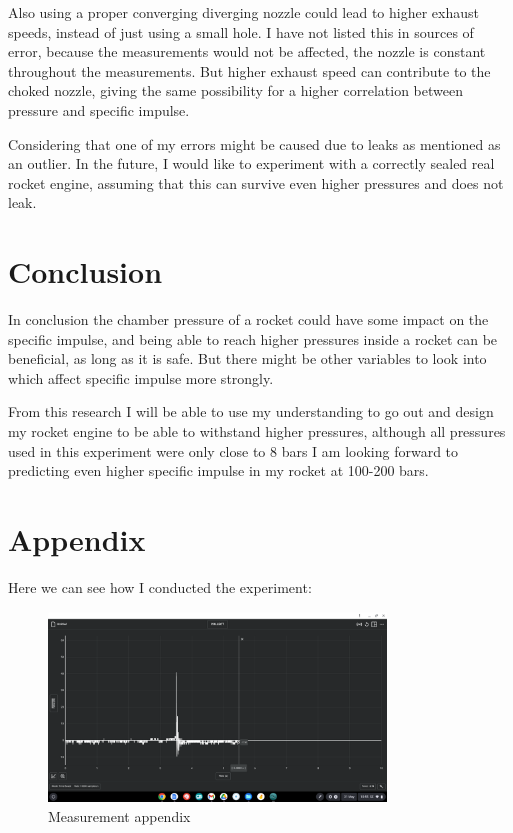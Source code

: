 \documentclass[12pt,a4paper]{article}
\begin{document}
Also using a proper converging diverging nozzle could lead to higher exhaust speeds, instead of just using a small hole. I have not listed this in sources of error, because the measurements would not be affected, the nozzle is constant throughout the measurements. But higher exhaust speed can contribute to the choked nozzle, giving the same possibility for a higher correlation between pressure and specific impulse.

Considering that one of my errors might be caused due to leaks as mentioned as an outlier. In the future, I would like to experiment with a correctly sealed real rocket engine, assuming that this can survive even higher pressures and does not leak.

\section{Conclusion}

In conclusion the chamber pressure of a rocket could have some impact on the specific impulse, and being able to reach higher pressures inside a rocket can be beneficial, as long as it is safe. But there might be other variables to look into which affect specific impulse more strongly.

From this research I will be able to use my understanding to go out and design my rocket engine to be able to withstand higher pressures, although all pressures used in this experiment were only close to 8 bars I am looking forward to predicting even higher specific impulse in my rocket at 100-200 bars.

\section{Appendix}

Here we can see how I conducted the experiment:

\begin{figure}[H]
\centering
\includegraphics[width=0.8\textwidth]{measering apendix.png}
\caption{Measurement appendix}
\label{fig:measurement_appendix}
\end{figure}
\end{document}
